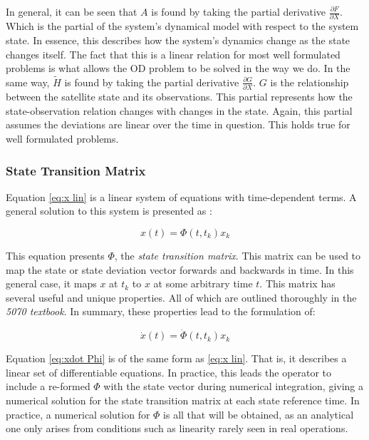 \documentclass[12pt,a4paper,oneside]{article}
\numberwithin{equation}{section}   		%
\begin{document}
In general, it can be seen that $A$ is found by taking the partial derivative $\frac{\partial{F}}{\partial{X}}$. Which is the partial of the system's dynamical model with respect to the system state. In essence, this describes how the system's dynamics change as the state changes itself. The fact that this is a linear relation for most well formulated problems is what allows the OD problem to be solved in the way we do. 
In the same way, $\tilde{H}$ is found by taking the partial derivative $\frac{\partial{G}}{\partial{X}}$. $G$ is the relationship between the satellite state and its observations. This partial represents how the state-observation relation changes with changes in the state. Again, this partial assumes the deviations are linear over the time in question. This holds true for well formulated problems. 




\subsubsection{State Transition Matrix}
\label{sec:OD sub STM}

Equation \eqref{eq:x lin} is a linear system of equations with time-dependent terms. A general solution to this system is presented as \cite{tapley2004statistical}: 

\begin{equation}
	x(t) = \Phi(t,t_k)x_k
	\label{eq:x Phi}
\end{equation}

This equation presents $\Phi$, the \emph{state transition matrix}. This matrix can be used to map the state or state deviation vector forwards and backwards in time. In this general case, it maps $x$ at $t_k$ to $x$ at some arbitrary time $t$. This matrix has several useful and unique properties. All of which are outlined thoroughly in the \emph{5070 textbook}. In summary, these properties lead to the formulation of:

\begin{equation}
	\dot{x}(t) =\dot{ \Phi}(t,t_k)x_k
	\label{eq:xdot Phi}
\end{equation}

Equation \eqref{eq:xdot Phi} is of the same form as \ref{eq:x lin}. That is, it describes a linear set of differentiable equations. In practice, this leads the operator to include a re-formed $\Phi$ with the state vector during numerical integration, giving a numerical solution for the state transition matrix at each state reference time. In practice, a numerical solution for $\Phi$ is all that will be obtained, as an analytical one only arises from conditions such as linearity rarely seen in real operations.
\end{document}
